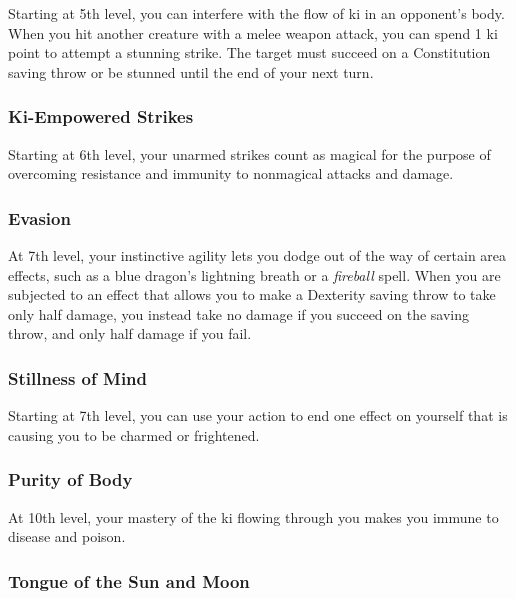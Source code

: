\documentclass[
]{article}
\begin{document}
Starting at 5th level, you can interfere with the flow of ki in an
opponent's body. When you hit another creature with a melee weapon
attack, you can spend 1 ki point to attempt a stunning strike. The
target must succeed on a Constitution saving throw or be stunned until
the end of your next turn.

\hypertarget{ki-empowered-strikes}{%
\subsubsection{Ki-Empowered Strikes}\label{ki-empowered-strikes}}

Starting at 6th level, your unarmed strikes count as magical for the
purpose of overcoming resistance and immunity to nonmagical attacks and
damage.

\hypertarget{evasion}{%
\subsubsection{Evasion}\label{evasion}}

At 7th level, your instinctive agility lets you dodge out of the way of
certain area effects, such as a blue dragon's lightning breath or a
\emph{fireball} spell. When you are subjected to an effect that allows
you to make a Dexterity saving throw to take only half damage, you
instead take no damage if you succeed on the saving throw, and only half
damage if you fail.

\hypertarget{stillness-of-mind}{%
\subsubsection{Stillness of Mind}\label{stillness-of-mind}}

Starting at 7th level, you can use your action to end one effect on
yourself that is causing you to be charmed or frightened.

\hypertarget{purity-of-body}{%
\subsubsection{Purity of Body}\label{purity-of-body}}

At 10th level, your mastery of the ki flowing through you makes you
immune to disease and poison.

\hypertarget{tongue-of-the-sun-and-moon}{%
\subsubsection{Tongue of the Sun and
Moon}\label{tongue-of-the-sun-and-moon}}
\end{document}
